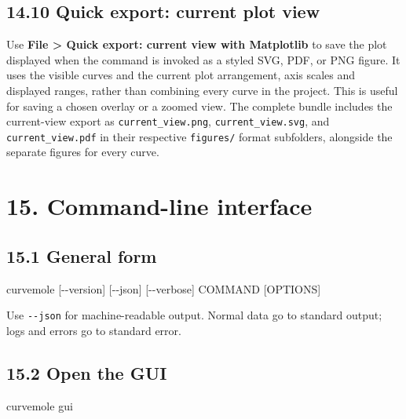 \documentclass[
  10pt,
  a4paper,
  oneside]{scrreprt}
\newenvironment{Shaded}{}{}
\newcommand{\ExtensionTok}[1]{#1}
\newcommand{\NormalTok}[1]{#1}
\begin{document}
\hypertarget{quick-export-current-plot-view}{%
\section{14.10 Quick export: current plot
view}\label{quick-export-current-plot-view}}

Use \textbf{File \textgreater{} Quick export: current view with
Matplotlib} to save the plot displayed when the command is invoked as a
styled SVG, PDF, or PNG figure. It uses the visible curves and the
current plot arrangement, axis scales and displayed ranges, rather than
combining every curve in the project. This is useful for saving a chosen
overlay or a zoomed view. The complete bundle includes the current-view
export as \texttt{current\_view.png}, \texttt{current\_view.svg}, and
\texttt{current\_view.pdf} in their respective \texttt{figures/} format
subfolders, alongside the separate figures for every curve.

\hypertarget{command-line-interface}{%
\chapter{15. Command-line interface}\label{command-line-interface}}

\hypertarget{general-form}{%
\section{15.1 General form}\label{general-form}}

\begin{Shaded}
\begin{Highlighting}[]
\ExtensionTok{curvemole}\NormalTok{ [{-}{-}version] [{-}{-}json] [{-}{-}verbose] COMMAND [OPTIONS]}
\end{Highlighting}
\end{Shaded}

Use \texttt{-\/-json} for machine-readable output. Normal data go to
standard output; logs and errors go to standard error.

\hypertarget{open-the-gui}{%
\section{15.2 Open the GUI}\label{open-the-gui}}

\begin{Shaded}
\begin{Highlighting}[]
\ExtensionTok{curvemole}\NormalTok{ gui}
\end{Highlighting}
\end{Shaded}
\end{document}
